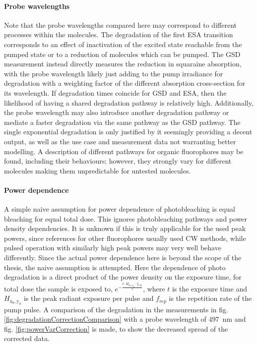\documentclass[twoside,openright,listof=numbered]{scrreprt}
\def\radiantExp{\ensuremath{H_\mathrm{x_0,y_0}}}
\begin{document}
\paragraph{Probe wavelengths}
Note that the probe wavelengths compared here may correspond to different processes within the molecules. The degradation of the first ESA transition corresponds to an effect of inactivation of the excited state reachable from the pumped state or to a reduction of molecules which can be pumped. The GSD measurement instead directly measures the reduction in squaraine absorption, with the probe wavelength likely just adding to the pump irradiance for degradation with a weighting factor of the different absorption cross-section for its wavelength. If degradation times coincide for GSD and ESA, then the likelihood of having a shared degradation pathway is relatively high. Additionally, the probe wavelength may also introduce another degradation pathway or mediate a faster degradation via the same pathway as the GSD pathway. The single exponential degradation is only justified by it seemingly providing a decent output, as well as the use case and measurement data not warranting better modelling. A description of different pathways for organic fluorophores may be found, including their behaviours; however, they strongly vary for different molecules making them unpredictable for untested molecules.\cite{Demchenko_2020}

\paragraph{Power dependence}
A simple naive assumption for power dependence of photobleaching is equal bleaching for equal total dose. This ignores photobleaching pathways and power density dependencies. It is unknown if this is truly applicable for the used peak powers, since references for other fluorophores usually used CW methods, while pulsed operation with similarly high peak powers may very well behave differently. Since the actual power dependence here is beyond the scope of the thesis, the naive assumption is attempted. Here the dependence of photo degradation is a direct product of the power density on the exposure time, for total dose the sample is exposed to, $e^{-\frac{t\cdot \radiantExp\cdot f_{rep}}{\tau}}$, where $t$ is the exposure time and $\radiantExp$ is the peak radiant exposure per pulse and $f_{rep}$ is the repetition rate of the pump pulse.\cite{Eggeling1998}
A comparison of the degradation in the measurements in fig. \ref{fig:degradationCorrectionComparison} with a probe wavelength of \SI{497}{\nano\meter} and fig. \ref{fig:powerVarCorrection} is made, to show the decreased spread of the corrected data.
\end{document}
